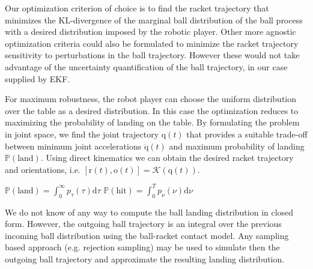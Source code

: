 \documentclass[letterpaper, 10 pt, conference]{ieeeconf}
\newcommand{\boldvec}[1]{\boldsymbol{\mathrm{#1}}}
\let\vec\boldvec
\newcommand{\kin}{\mathcal{K}} %
\newcommand{\joint}{\vec{q}} %
\newcommand{\racket}{\vec{r}} %
\newcommand{\orient}{\vec{o}} %
\newcommand{\prob}{\mathbb{P}} %
\newcommand{\landTime}{\tau} %
\newcommand{\landDist}{p_{\tau}} %
\newcommand{\hitTime}{\nu} %
\newcommand{\hitDist}{p_{\nu}} %
\begin{document}
Our optimization criterion of choice is to find the racket trajectory that minimizes the KL-divergence of the marginal ball distribution of the ball process with a desired distribution imposed by the robotic player. Other more agnostic optimization criteria could also be formulated to minimize the racket trajectory sensitivity to perturbations in the ball trajectory. However these would not take advantage of the uncertainty quantification of the ball trajectory, in our case supplied by EKF.

For maximum robustness, the robot player can choose the uniform distribution over the table as a desired distribution. In this case the optimization reduces to maximizing the probability of landing on the table. By formulating the problem in joint space, we find the joint trajectory $\joint(t)$ that provides a suitable trade-off between minimum joint accelerations $\ddot{\joint}(t)$ and maximum probability of landing $\prob(\textrm{land})$. Using direct kinematics we can obtain the desired racket trajectory and orientations, i.e. $[\racket(t),\orient(t)] = \kin(\joint(t))$.

$\prob(\textrm{land}) = \int_{0}^{\infty}\landDist(\landTime)\textrm{d}\landTime$
$\prob(\textrm{hit}) = \int_{0}^{T}\hitDist(\hitTime)\textrm{d}\hitTime$


% 

%
%
%

We do not know of any way to compute the ball landing distribution in closed form. However, the outgoing ball trajectory is an integral over the previous incoming ball distribution using the ball-racket contact model. Any sampling based approach (e.g. rejection sampling) may be used to simulate then the outgoing ball trajectory and approximate the resulting landing distribution. 
\end{document}
